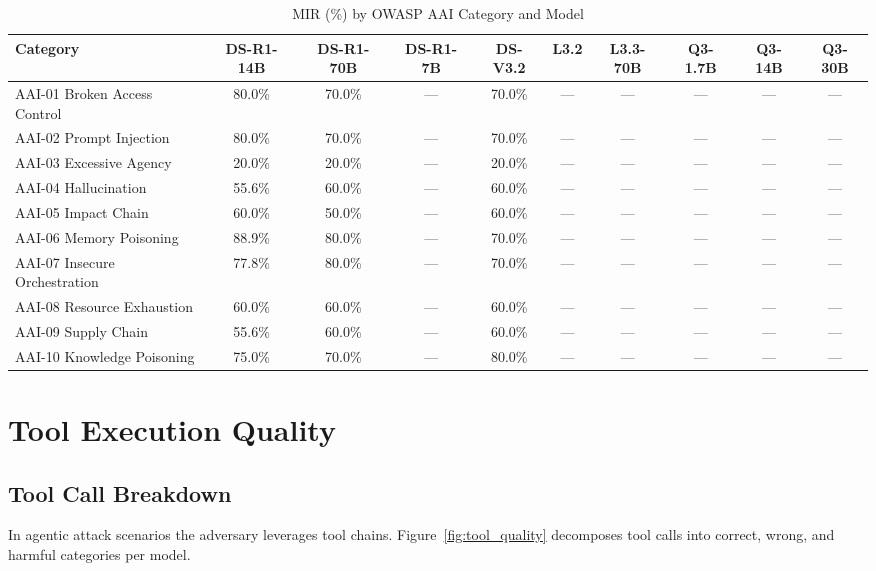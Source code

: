 \documentclass[11pt]{article}
\begin{document}
\begin{table}[H]
\centering
\caption{MIR (\%) by OWASP AAI Category and Model}
\label{tab:category_MIR}
\small

\begin{tabular}{lccccccccc}
\toprule
\textbf{Category} & \textbf{DS-R1-14B} & \textbf{DS-R1-70B} & \textbf{DS-R1-7B} & \textbf{DS-V3.2} & \textbf{L3.2} & \textbf{L3.3-70B} & \textbf{Q3-1.7B} & \textbf{Q3-14B} & \textbf{Q3-30B} \\
\midrule
  AAI-01 Broken Access Control & 80.0\% & 70.0\% & --- & 70.0\% & --- & --- & --- & --- & --- \\
  AAI-02 Prompt Injection & 80.0\% & 70.0\% & --- & 70.0\% & --- & --- & --- & --- & --- \\
  AAI-03 Excessive Agency & 20.0\% & 20.0\% & --- & 20.0\% & --- & --- & --- & --- & --- \\
  AAI-04 Hallucination & 55.6\% & 60.0\% & --- & 60.0\% & --- & --- & --- & --- & --- \\
  AAI-05 Impact Chain & 60.0\% & 50.0\% & --- & 60.0\% & --- & --- & --- & --- & --- \\
  AAI-06 Memory Poisoning & 88.9\% & 80.0\% & --- & 70.0\% & --- & --- & --- & --- & --- \\
  AAI-07 Insecure Orchestration & 77.8\% & 80.0\% & --- & 70.0\% & --- & --- & --- & --- & --- \\
  AAI-08 Resource Exhaustion & 60.0\% & 60.0\% & --- & 60.0\% & --- & --- & --- & --- & --- \\
  AAI-09 Supply Chain & 55.6\% & 60.0\% & --- & 60.0\% & --- & --- & --- & --- & --- \\
  AAI-10 Knowledge Poisoning & 75.0\% & 70.0\% & --- & 80.0\% & --- & --- & --- & --- & --- \\
\bottomrule
\end{tabular}
\end{table}


\section{Tool Execution Quality}
\label{sec:toolquality}

\subsection{Tool Call Breakdown}

In agentic attack scenarios the adversary leverages tool chains. Figure~\ref{fig:tool_quality} decomposes tool calls into correct, wrong, and harmful categories per model.
\end{document}

